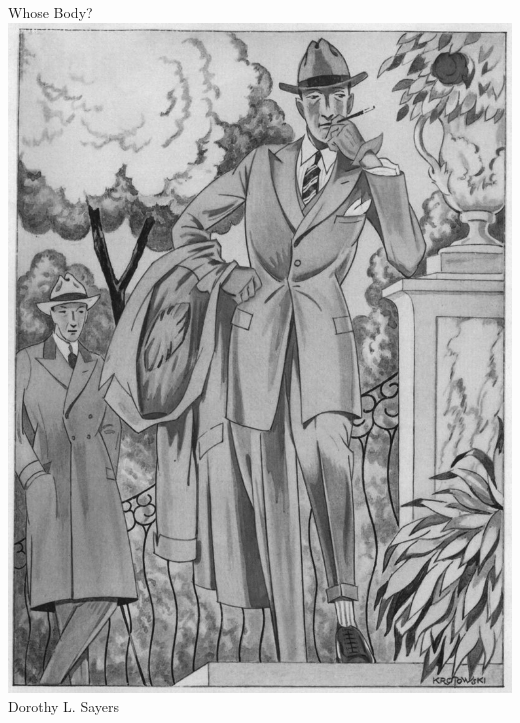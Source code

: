 \documentclass[
a5paper,
BCOR=7mm,
twoside,
DIV=calc,
11pt,
usegeometry,
chapterprefix,
headings=big]{scrbook} %
\newcommand{\reasonablyhuge}{\fontsize{50}{60}\selectfont}
\def\coverimagesize{.6\linewidth}
\newcommand{\HUGE}{\fontsize{90}{90}\selectfont}
\def\coverimagesize{.7\linewidth}
\newcommand{\HUGE}{\fontsize{90}{90}\selectfont}
\begin{document}
\setlength{\epigraphwidth}{0.8\textwidth}
\renewcommand{\epigraphflush}{center}
\renewcommand{\sourceflush}{center}

\frontmatter
\pagestyle{empty}
\begin{titlepage}

   \recalctypearea

  \begin{center}\mytitlefont
{\HUGE Whose Body?}\\
\vfill
\includegraphics[width=\coverimagesize]{pensiveguy}\\
\vfill
{}\mytitlefont
{\reasonablyhuge Dorothy L. Sayers}\\
\end{center}


\end{titlepage}
\end{document}

